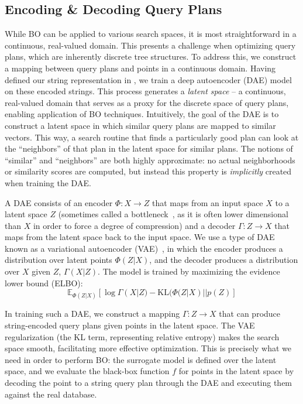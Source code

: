 





\subsection{Encoding \& Decoding Query Plans} \label{sec:technique-vae}
While BO can be applied to various search spaces, it is most straightforward in a continuous, real-valued domain. This presents a challenge when optimizing query plans, which are inherently discrete tree structures. To address this, we construct a mapping between query plans and points in a continuous domain. Having defined our string representation in , we train a deep autoencoder (DAE) model on these encoded strings. This process generates a \emph{latent space} – a continuous, real-valued domain that serves as a proxy for the discrete space of query plans, enabling application of BO techniques. Intuitively, the goal of the DAE is to construct a latent space in which similar query plans are mapped to similar vectors. This way, a search routine that finds a particularly good plan can look at the ``neighbors'' of that plan in the latent space for similar plans. The notions of ``similar'' and ``neighbors'' are both highly approximate: no actual neighborhoods or similarity scores are computed, but instead this property is \emph{implicitly} created when training the DAE.

A DAE consists of an encoder $\Phi: X \to Z$ that maps from an input space $X$ to a latent space $Z$ (sometimes called a bottleneck~\cite{bottleneck}, as it is often lower dimensional than $X$ in order to force a degree of compression) and a decoder $\Gamma : Z \to X$ that maps from the latent space back to the input space. We use a type of DAE known as a variational autoencoder (VAE)~\cite{KingmaW13}, in which the encoder produces a distribution over latent points $\Phi(Z | X)$, and the decoder produces a distribution over $X$ given $Z$, $\Gamma(X | Z)$. The model is trained by maximizing the evidence lower bound (ELBO):
$$
\mathbb{E}_{\Phi(Z | X)}[\log \Gamma(X | Z) - \text{KL}(\Phi(Z | X) || p(Z) ]
$$

In training such a DAE, we construct a mapping $\Gamma : Z \to X$ that can produce string-encoded query plans given points in the latent space. The VAE regularization (the KL term, representing relative entropy) makes the search space smooth, facilitating more effective optimization. This is precisely what we need in order to perform BO: the surrogate model is defined over the latent space, and we evaluate the black-box function $f$ for points in the latent space by decoding the point to a string query plan through the DAE and executing them against the real database.

